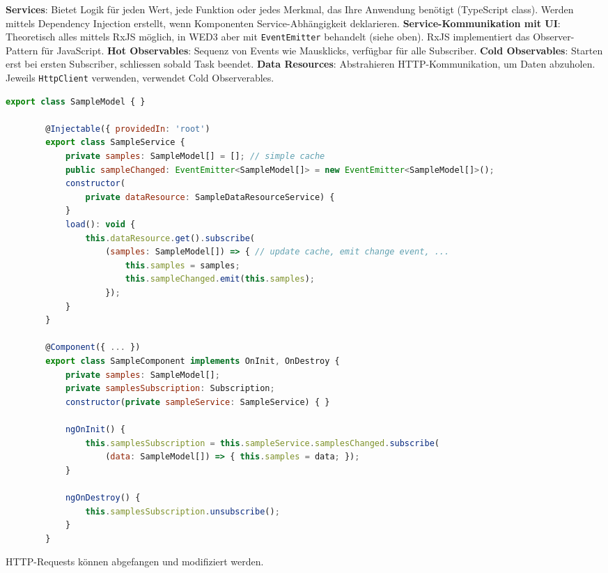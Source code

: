 \documentclass[10pt,landscape]{article}
\begin{document}
\begin{multicols}{2}
        \textbf{Services}: Bietet Logik für jeden Wert, jede Funktion oder jedes Merkmal, das Ihre Anwendung benötigt (TypeScript class).
        Werden mittels Dependency Injection erstellt, wenn Komponenten Service-Abhängigkeit deklarieren.
        \textbf{Service-Kommunikation mit UI}: Theoretisch alles mittels RxJS möglich, in WED3 aber mit \lstinline{EventEmitter} behandelt (siehe oben).
        RxJS implementiert das Observer-Pattern für JavaScript.
        \textbf{Hot Observables}: Sequenz von Events wie Mausklicks, verfügbar für alle Subscriber.
        \textbf{Cold Observables}: Starten erst bei ersten Subscriber, schliessen sobald Task beendet.
        \textbf{Data Resources}: Abstrahieren HTTP-Kommunikation, um Daten abzuholen.
        Jeweils \lstinline{HttpClient} verwenden, verwendet Cold Observerables.

        \begin{lstlisting}[language=JavaScript]
        export class SampleModel { }

        @Injectable({ providedIn: 'root')
        export class SampleService {
            private samples: SampleModel[] = []; // simple cache
            public sampleChanged: EventEmitter<SampleModel[]> = new EventEmitter<SampleModel[]>();
            constructor(
                private dataResource: SampleDataResourceService) {
            }
            load(): void {
                this.dataResource.get().subscribe(
                    (samples: SampleModel[]) => { // update cache, emit change event, ...
                        this.samples = samples;
                        this.sampleChanged.emit(this.samples);
                    });
            }
        }

        @Component({ ... })
        export class SampleComponent implements OnInit, OnDestroy {
            private samples: SampleModel[];
            private samplesSubscription: Subscription;
            constructor(private sampleService: SampleService) { }

            ngOnInit() {
                this.samplesSubscription = this.sampleService.samplesChanged.subscribe(
                    (data: SampleModel[]) => { this.samples = data; });
            }

            ngOnDestroy() {
                this.samplesSubscription.unsubscribe();
            }
        }
        \end{lstlisting}

        HTTP-Requests können abgefangen und modifiziert werden.


\end{multicols}
\end{document}
